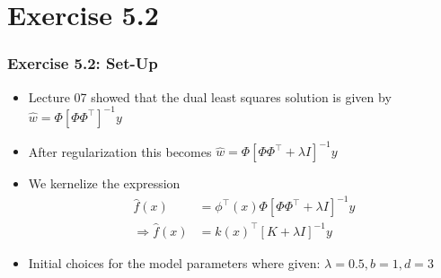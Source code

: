 \documentclass[10pt,aspectratio=169,handout]{beamer}
\begin{document}



\section{Exercise 5.2}

\begin{frame}
    \frametitle{Exercise 5.2: Set-Up}

    \begin{itemize}
        \item Lecture 07 showed that the dual least squares solution is given by $\hat{w}=\Phi[\Phi\Phi^\intercal]^{-1}y$
        \item After regularization this becomes $\hat{w}=\Phi[\Phi\Phi^\intercal+\lambda I]^{-1}y$
        \item We kernelize the expression \begin{align} 
                                            \hat{f}(x) &= \phi^\intercal(x)\Phi[\Phi\Phi^\intercal+\lambda I]^{-1}y \\
                                \Rightarrow \hat{f}(x) &= k(x)^\intercal[K+\lambda I]^{-1}y
                                          \end{align}
        \item Initial choices for the model parameters where given: $\lambda=0.5,b=1,d=3$
    \end{itemize}

\end{frame}
\end{document}
